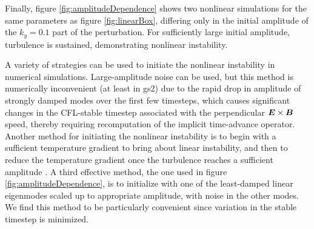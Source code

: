 \documentclass[12pt,superscriptaddress]{revtex4}
\newcommand{\vect}[1]{\mbox{\boldmath $#1$}}
\begin{document}
Finally, figure \ref{fig:amplitudeDependence} shows two nonlinear simulations for the same parameters as figure \ref{fig:linearBox},
differing only in the initial amplitude of the $k_y=0.1$ part of the perturbation.
For sufficiently large initial amplitude, turbulence is sustained,
demonstrating nonlinear instability.

A variety of strategies can be used to initiate the nonlinear instability in numerical simulations.
Large-amplitude noise can be used, but this method is numerically inconvenient (at least in gs2) due to the rapid
drop in amplitude of strongly damped modes over the first few timesteps,
which causes significant changes in the CFL-stable timestep associated
with the perpendicular $\vect{E}\times\vect{B}$ speed,
thereby requiring recomputation of the implicit time-advance operator.
Another method for initiating the nonlinear instability is to begin with a sufficient
temperature gradient to bring about linear instability, and then to reduce the temperature gradient
once the turbulence reaches a sufficient amplitude \cite{Drake}.
A third effective method, the one used in figure \ref{fig:amplitudeDependence},
is to initialize with one of the least-damped linear eigenmodes scaled up to appropriate amplitude, with noise in the other modes.  We find this method to be particularly convenient since variation in the stable timestep
is minimized.
\end{document}
